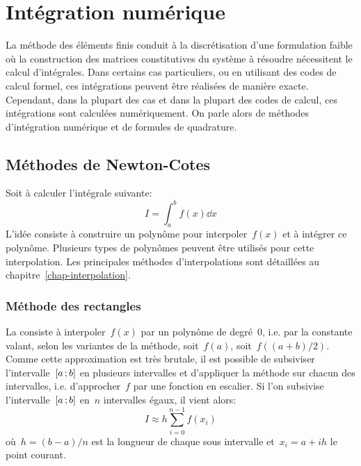 \chapter{Intégration numérique}\label{chap-quadrature} 
La méthode des éléments finis conduit à la discrétisation d'une formulation faible où la construction des matrices constitutives du système à résoudre nécessitent le calcul d'intégrales. Dans certains cas particuliers, ou en utilisant des codes de calcul formel, ces intégrations peuvent être réalisées de manière exacte. Cependant, dans la plupart des cas et dans la plupart des codes de calcul, ces intégrations sont calculées numériquement. On parle alors de méthodes d'intégration numérique et de formules de quadrature. 
\section{Méthodes de Newton-Cotes}
Soit à calculer l'intégrale suivante: 
\begin{equation}
I=\int_a^b f(x)\dd x
\end{equation}
L'idée consiste à construire un polynôme pour interpoler~$f(x)$ et à intégrer ce polynôme. Plusieurs types de polynômes peuvent être utilisés pour cette interpolation. Les principales méthodes d'interpolations sont détaillées au chapitre~\ref{chap-interpolation}. 
\subsection{Méthode des rectangles}
La  consiste à interpoler~$f(x)$ par un polynôme de degré~$0$, i.e. par la constante valant, selon les variantes de la méthode, soit~$f(a)$, soit~$f((a+b)/2)$. Comme cette approximation est très brutale, il est possible de subsiviser l'intervalle~$\mathopen{[}a\,;b\mathclose{]}$ en plusieurs intervalles et d'appliquer la méthode sur chacun des intervalles, i.e. d'approcher~$f$ par une fonction en escalier. Si l'on subsivise l'intervalle~$\mathopen{[}a\,;b\mathclose{]}$ en~$n$ intervalles égaux, il vient alors: 
\begin{equation}
I\approx h\sum_{i=0}^{n-1} f(x_i)
\end{equation}
où~$h=(b-a)/n$ est la longueur de chaque sous intervalle et~$x_i=a+ih$ le point courant. 
